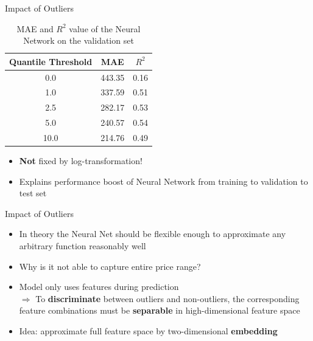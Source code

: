 \documentclass[ngerman,inputenc]{beamer}
\begin{document}
\begin{frame}{Impact of Outliers}
  \begin{table}[t]
    \centering
    \begin{tabular}{@{}ccc@{}}
      \toprule
      Quantile Threshold & MAE    & $R^2$ \\ \midrule
      0.0                & 443.35 & 0.16  \\
      1.0                & 337.59 & 0.51  \\
      2.5                & 282.17 & 0.53  \\
      5.0                & 240.57 & 0.54  \\
      10.0               & 214.76 & 0.49  \\ \bottomrule
    \end{tabular}
    \caption{MAE and $R^2$ value of the Neural Network on the validation set}
    \label{tab:mlp-outliers}
  \end{table}
  \pause
  \begin{itemize}
    \item \textbf{Not} fixed by log-transformation!
    \item Explains performance boost of Neural Network from training to validation to test set
  \end{itemize}
\end{frame}

\begin{frame}{Impact of Outliers}
  \begin{itemize}
    \item In theory the Neural Net should be flexible enough to approximate any arbitrary function reasonably well
    \item Why is it not able to capture entire price range? \pause
    \item Model only uses features during prediction \\
          $\Rightarrow$ To \textbf{discriminate} between outliers and non-outliers, the corresponding feature combinations must be \textbf{separable} in high-dimensional feature space
    \item Idea: approximate full feature space by two-dimensional \textbf{embedding}
  \end{itemize}
\end{frame}
\end{document}
